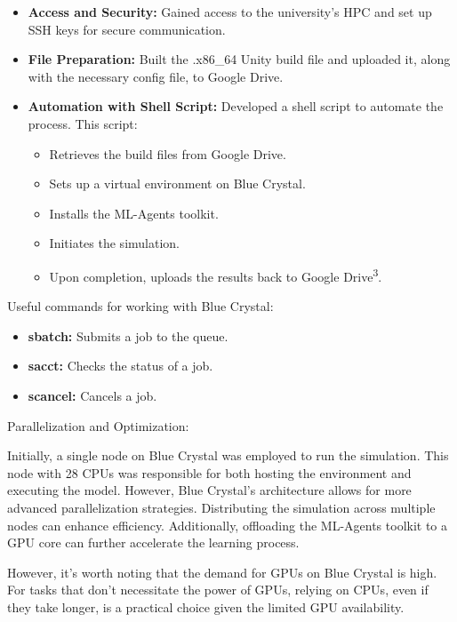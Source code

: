 \begin{itemize}
    \item \textbf{Access and Security:} Gained access to the university's HPC and set up SSH keys for secure communication.
    \item \textbf{File Preparation:} Built the .x86\_64 Unity build file and uploaded it, along with the necessary config file, to Google Drive.
    \item \textbf{Automation with Shell Script:} Developed a shell script to automate the process. This script:
    \begin{itemize}
        \item Retrieves the build files from Google Drive.
        \item Sets up a virtual environment on Blue Crystal.
        \item Installs the ML-Agents toolkit.
        \item Initiates the simulation.
        \item Upon completion, uploads the results back to Google Drive\textsuperscript{3}.
    \end{itemize}
\end{itemize}

Useful commands for working with Blue Crystal:

\begin{itemize}
    \item \textbf{sbatch:} Submits a job to the queue.
    \item \textbf{sacct:} Checks the status of a job.
    \item \textbf{scancel:} Cancels a job.
\end{itemize}

Parallelization and Optimization:

Initially, a single node on Blue Crystal was employed to run the simulation. This node with 28 CPUs was responsible for both hosting the environment and executing the model. However, Blue Crystal's architecture allows for more advanced parallelization strategies. Distributing the simulation across multiple nodes can enhance efficiency. Additionally, offloading the ML-Agents toolkit to a GPU core can further accelerate the learning process.

However, it's worth noting that the demand for GPUs on Blue Crystal is high. For tasks that don't necessitate the power of GPUs, relying on CPUs, even if they take longer, is a practical choice given the limited GPU availability.





